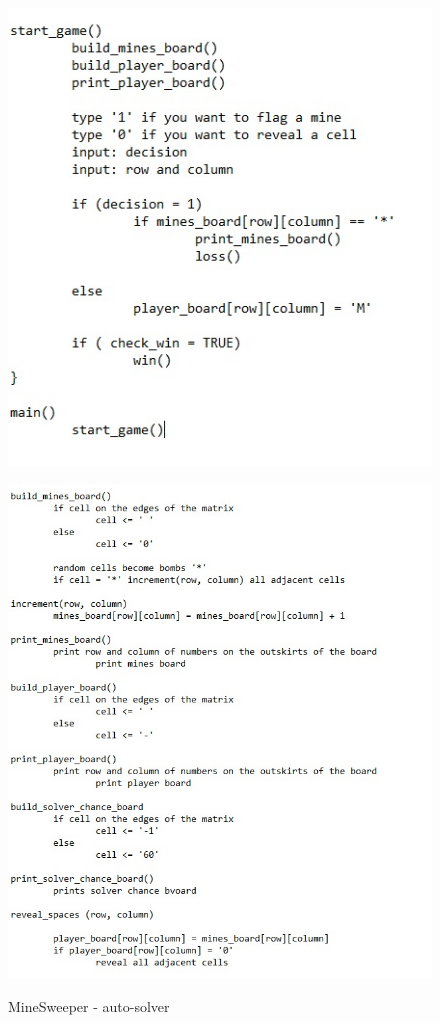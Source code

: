 \documentclass{article}
\begin{document}
\pagebreak
\begin{figure}[h!]
\includegraphics[scale=1]{2}
\label{fig:universe}
\end{figure}


\pagebreak
\begin{figure}[h!]
\caption{MineSweeper - auto-solver}
\includegraphics[scale=0.8]{3}
\label{fig:universe}
\end{figure}
\end{document}
